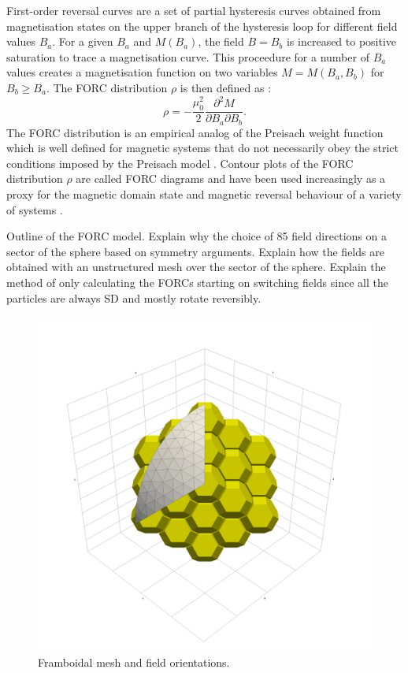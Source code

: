 First-order reversal curves are a set of partial hysteresis curves obtained from magnetisation states on the upper branch of the hysteresis loop for different field values $B_a$. For a given $B_a$ and $M(B_a)$, the field $B=B_b$ is increased to positive saturation to trace a magnetisation curve. This proceedure for a number of $B_a$ values creates a magnetisation function on two variables $M=M(B_a,B_b)$ for $B_b \geq B_a$. The FORC distribution $\rho$ is then defined as \citep{Roberts2000}:
\begin{equation}
\rho = -\frac{\mu_0^2}{2}\frac{\partial^2 M}{\partial B_a \partial B_b}.
\end{equation}
The FORC distribution is an empirical analog of the Preisach weight function which is well defined for magnetic systems that do not necessarily obey the strict conditions imposed by the Preisach model \citep{Mayergoyz1986}. Contour plots of the FORC distribution $\rho$ are called FORC diagrams and have been used increasingly as a proxy for the magnetic domain state and magnetic reversal behaviour of a variety of systems \citep{Pike1999,Pike2001,Roberts2000,Dumas2007,Egli2010,Egli2014,Biasi2016,Proenca2017,Zhao2017}.\par
Outline of the FORC model. Explain why the choice of 85 field directions on a sector of the sphere based on symmetry arguments. Explain how the fields are obtained with an unstructured mesh over the sector of the sphere. Explain the method of only calculating the FORCs starting on switching fields since all the particles are always SD and mostly rotate reversibly.\par
\begin{figure}
\centering
\includegraphics[width=\textwidth]{research-4/figs/mesh_orientations_HD.png}
\caption[Framboidal mesh and field orientations]{Framboidal mesh and field orientations.}
\label{FIG_01}
\end{figure}

